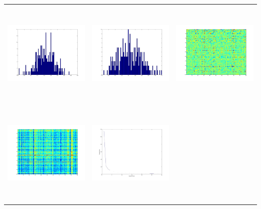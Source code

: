 \begin{tabular}{ |c|c|c| }
\includegraphics[width=5.0cm,height=5.0cm]{images/ClusterCoeff_Hist_ErdoReyani_Graph_SameVertexSet_mean0_421961099815438.jpg} &
\includegraphics[width=5.0cm,height=5.0cm]{images/ClusterCoeff_Hist_PreScaleFree_mean_0_205047904366710.jpg}                   &
\includegraphics[width=5.0cm,height=5.0cm]{images/CVX_NNMF_A-YX_Where_Y_X_PSD.jpg}                                               \\
\includegraphics[width=5.0cm,height=5.0cm]{images/CVX_NNMF_A.jpg}                                                                  &
\includegraphics[width=5.0cm,height=5.0cm]{images/CVX_NNMF_Residuals.jpg}                                                           &

\end{tabular}
